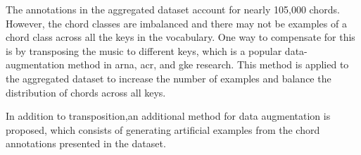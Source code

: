 
The annotations in the aggregated dataset account for nearly
105,000 chords. However, the chord classes are imbalanced
and there may not be examples of a chord class across all
the keys in the vocabulary. One way to compensate for this
is by transposing the music to different keys, which is a
popular data-augmentation method in \gls{arna}, \gls{acr},
and \gls{gke} research. This method is applied to the
aggregated dataset to increase the number of examples and
balance the distribution of chords across all keys.

In addition to transposition,an additional method for data
augmentation is proposed, which consists of generating
artificial examples from the chord annotations presented in
the dataset.
